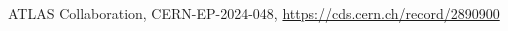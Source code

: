 \documentclass{thesissummary}
\begin{document}
\begin{thebibliography}{99}
 ATLAS Collaboration, CERN-EP-2024-048, \url{https://cds.cern.ch/record/2890900}
%
%
%
%
%
%
%
%
%
%
%
%
%
\end{thebibliography}
\end{document}
